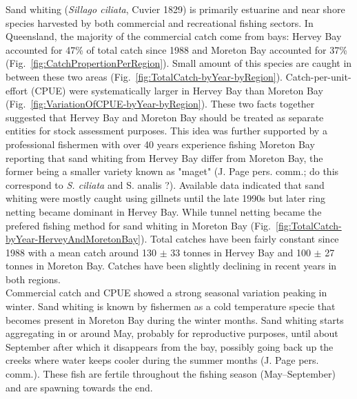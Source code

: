 Sand whiting  ({\it Sillago ciliata}, Cuvier 1829) is primarily estuarine and near shore species harvested by both commercial and recreational fishing sectors\citep{JAI:JAI12478}. In Queensland, the majority of the commercial catch come from bays: Hervey Bay accounted for 47\% of total catch since 1988 and Moreton Bay accounted for 37\% (Fig.~\ref{fig:CatchPropertionPerRegion}). Small amount of this species are caught in between these two areas (Fig.~\ref{fig:TotalCatch-byYear-byRegion}). Catch-per-unit-effort (CPUE) were systematically larger in Hervey Bay than Moreton Bay (Fig.~\ref{fig:VariationOfCPUE-byYear-byRegion}). These two facts together suggested that Hervey Bay and Moreton Bay should be treated as separate entities for stock assessment purposes. This idea was further supported by a professional fishermen with over 40 years experience fishing Moreton Bay reporting that sand whiting from Hervey Bay differ from Moreton Bay, the former being a smaller variety known as "maget" (J. Page pers. comm.; do this correspond to {\it S. ciliata} and {S. analis} ?). Available data indicated that sand whiting were mostly caught using gillnets until the late 1990s but later ring netting became dominant in Hervey Bay. While tunnel netting became the prefered fishing method for sand whiting in Moreton Bay (Fig.~\ref{fig:TotalCatch-byYear-HerveyAndMoretonBay}). Total catches have been fairly constant since 1988 with a mean catch around 130 $\pm$ 33 tonnes in Hervey Bay and 100 $\pm$ 27 tonnes in Moreton Bay. Catches have been slightly declining in recent years in both regions. \\

Commercial catch and CPUE showed a strong seasonal variation peaking in winter. Sand whiting is known by fishermen as a cold temperature specie that becomes present in Moreton Bay during the winter months. Sand whiting starts aggregating in or around May, probably for reproductive purposes, until about September after which it disappears from the bay, possibly going back up the creeks where water keeps cooler during the summer months (J. Page pers. comm.). These fish are fertile throughout the fishing season (May--September) and are spawning towards the end.\\



